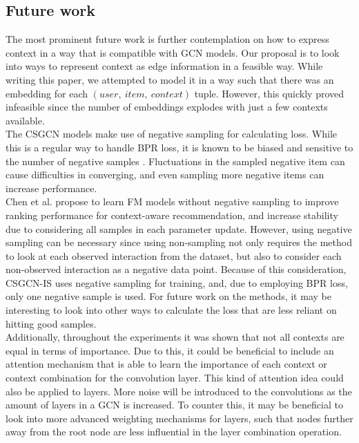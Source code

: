 
\subsection{Future work}
The most prominent future work is further contemplation on how to express context in a way that is compatible with GCN models.
Our proposal is to look into ways to represent context as edge information in a feasible way.
While writing this paper, we attempted to model it in a way such that there was an embedding for each $(user,\:item,\:context)$ tuple.
However, this quickly proved infeasible since the number of embeddings explodes with just a few contexts available.
\\
The CSGCN models make use of negative sampling for calculating loss.
While this is a regular way to handle BPR loss, it is known to be biased \cite{nonsampling,NegativeSampling} and sensitive to the number of negative samples \cite{NCF}.
Fluctuations in the sampled negative item can cause difficulties in converging, and even sampling more negative items can increase performance.\\
Chen et al. \cite{nonsampling} propose to learn FM models without negative sampling to improve ranking performance for context-aware recommendation, and increase stability due to considering all samples in each parameter update.
However, using negative sampling can be necessary since using non-sampling not only requires the method to look at each observed interaction from the dataset, but also to consider each non-observed interaction as a negative data point.
Because of this consideration, CSGCN-IS uses negative sampling for training, and, due to employing BPR loss, only one negative sample is used.
For future work on the methods, it may be interesting to look into other ways to calculate the loss that are less reliant on hitting good samples.
\\
Additionally, throughout the experiments it was shown that not all contexts are equal in terms of importance.
Due to this, it could be beneficial to include an attention mechanism that is able to learn the importance of each context or context combination for the convolution layer.
This kind of attention idea could also be applied to layers.
More noise will be introduced to the convolutions as the amount of layers in a GCN is increased.
To counter this, it may be beneficial to look into more advanced weighting mechanisms for layers, such that nodes further away from the root node are less influential in the layer combination operation.
